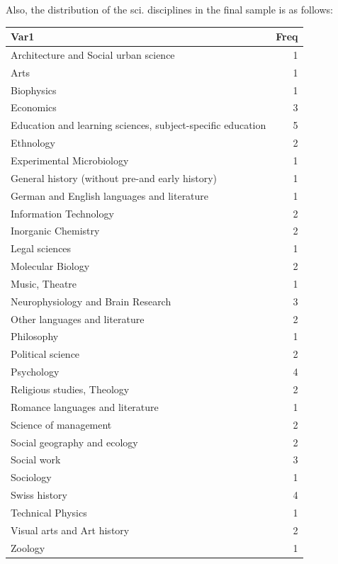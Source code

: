 \documentclass[]{tufte-book}
\begin{document}
Also, the distribution of the sci. disciplines in the final sample is as
follows:

\begin{longtable}[]{@{}lr@{}}
\toprule
Var1 & Freq \\
\midrule
\endhead
Architecture and Social urban science & 1 \\
Arts & 1 \\
Biophysics & 1 \\
Economics & 3 \\
Education and learning sciences, subject-specific education & 5 \\
Ethnology & 2 \\
Experimental Microbiology & 1 \\
General history (without pre-and early history) & 1 \\
German and English languages and literature & 1 \\
Information Technology & 2 \\
Inorganic Chemistry & 2 \\
Legal sciences & 1 \\
Molecular Biology & 2 \\
Music, Theatre & 1 \\
Neurophysiology and Brain Research & 3 \\
Other languages and literature & 2 \\
Philosophy & 1 \\
Political science & 2 \\
Psychology & 4 \\
Religious studies, Theology & 2 \\
Romance languages and literature & 1 \\
Science of management & 2 \\
Social geography and ecology & 2 \\
Social work & 3 \\
Sociology & 1 \\
Swiss history & 4 \\
Technical Physics & 1 \\
Visual arts and Art history & 2 \\
Zoology & 1 \\
\bottomrule
\end{longtable}


\end{document}
